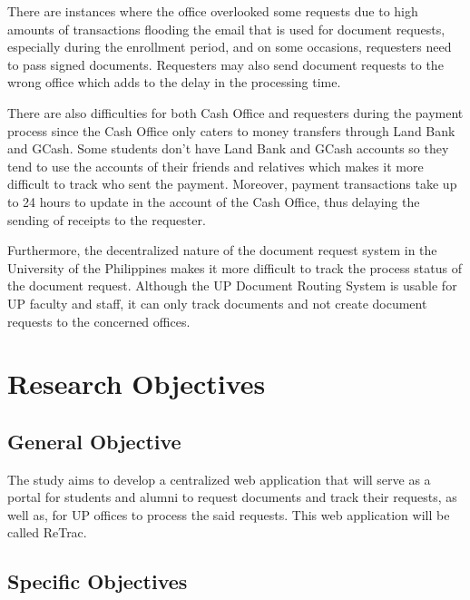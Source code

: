 There are instances where the office overlooked some requests due to high amounts of transactions flooding the email that is used for document requests, especially during the enrollment period, and on some occasions, requesters need to pass signed documents. Requesters may also send document requests to the wrong office which adds to the delay in the processing time.

There are also difficulties for both Cash Office and requesters during the payment process since the Cash Office only caters to money transfers through Land Bank and GCash. Some students don't have Land Bank and GCash accounts so they tend to use the accounts of their friends and relatives which makes it more difficult to track who sent the payment. Moreover, payment transactions take up to 24 hours to update in the account of the Cash Office, thus delaying the sending of receipts to the requester.

Furthermore, the decentralized nature of the document request system in the University of the Philippines makes it more difficult to track the process status of the document request. Although the UP Document Routing System is usable for UP faculty and staff, it can only track documents and not create document requests to the concerned offices.


\section{Research Objectives}
\label{sec:researchobjectives}

\subsection{General Objective}
\label{sec:generalobjective}

The study aims to develop a centralized web application that will serve as a portal for students and alumni to request documents and track their requests, as well as, for UP offices to process the said requests. This web application will be called ReTrac.


\subsection{Specific Objectives}
\label{sec:specificobjectives}


